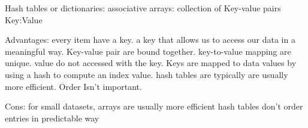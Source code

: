 Hash tables or dictionaries:
  associative arrays:
    collection of Key-value pairs 
    Key:Value

  Advantages:
    every item have a key. 
    a key that allows us to access our data in a meaningful way.
    Key-value pair are bound together.
    key-to-value mapping are unique.
    value do not accessed with the key.
    Keys are mapped to data values by using a hash to compute an index value.
    hash tables are typically are usually more efficient.
    Order Isn't important.
    

  Cons: 
    for small datasets, arrays are usually more efficient
    hash tables don't order entries in predictable way 